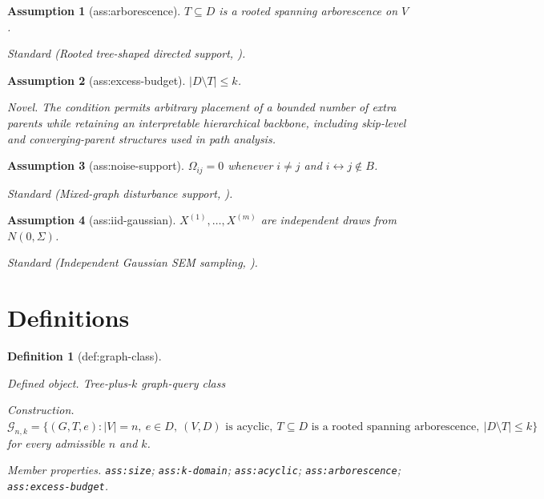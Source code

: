 \documentclass{article}
\newtheorem{assumption}{Assumption}
\newtheorem{definition}{Definition}
\begin{document}
\begin{assumption}[ass:arborescence]\label{ass:arborescence}
\(T\subseteq D\) is a rooted spanning arborescence on \(V\).
\par\smallskip\noindent\emph{Standard} (Rooted tree-shaped directed support, \cite{GuptaBlaser2024TreeSCM}).
\end{assumption}

\begin{assumption}[ass:excess-budget]\label{ass:excess-budget}
\(|D\setminus T|\le k\).
\par\smallskip\noindent\emph{Novel.} The condition permits arbitrary placement of a bounded number of extra parents while retaining an interpretable hierarchical backbone, including skip-level and converging-parent structures used in path analysis.
\end{assumption}

\begin{assumption}[ass:noise-support]\label{ass:noise-support}
\(\Omega_{ij}=0\) whenever \(i\ne j\) and \(i\leftrightarrow j\notin B\).
\par\smallskip\noindent\emph{Standard} (Mixed-graph disturbance support, \cite{FoygelDraismaDrton2012HTC}).
\end{assumption}

\begin{assumption}[ass:iid-gaussian]\label{ass:iid-gaussian}
\(X^{(1)},\ldots,X^{(m)}\) are independent draws from \(N(0,\Sigma)\).
\par\smallskip\noindent\emph{Standard} (Independent Gaussian SEM sampling, \cite{FoygelDraismaDrton2012HTC}).
\end{assumption}

\section{Definitions}

\begin{definition}[def:graph-class]\label{def:graph-class}
\par\smallskip\noindent\emph{Defined object.} Tree-plus-\(k\) graph-query class
\par\smallskip\noindent\emph{Construction.} \(\mathcal G_{n,k}=\{(G,T,e):|V|=n,\ e\in D,\ (V,D)\text{ is acyclic},\ T\subseteq D\text{ is a rooted spanning arborescence},\ |D\setminus T|\le k\}\) for every admissible \(n\) and \(k\).
\par\smallskip\noindent\emph{Member properties.} \texttt{ass:\allowbreak{}size}; \texttt{ass:\allowbreak{}k-\allowbreak{}domain}; \texttt{ass:\allowbreak{}acyclic}; \texttt{ass:\allowbreak{}arborescence}; \texttt{ass:\allowbreak{}excess-\allowbreak{}budget}.
\end{definition}
\end{document}
